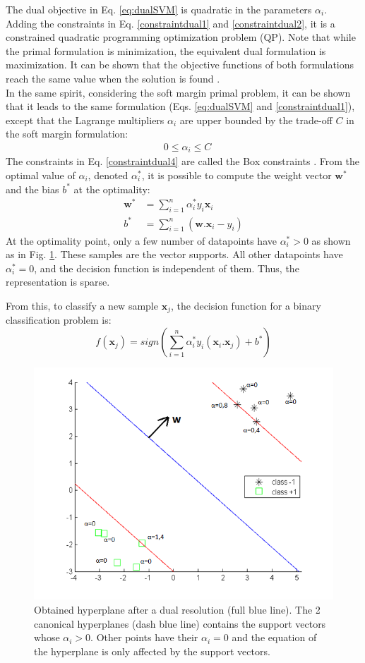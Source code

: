 \noindent The dual objective in Eq. \ref{eq:dualSVM} is quadratic in the parameters $\alpha_i$. Adding the constraints in Eq. \ref{constraintdual1} and \ref{constraintdual2}, it is a constrained quadratic programming optimization problem (QP). Note that while the primal formulation is minimization, the equivalent dual formulation is maximization. It can be shown that the objective functions of both formulations reach the same value when the solution is found \cite{Campbell2011}. \\
In the same spirit, considering the soft margin primal problem, it can be shown that it leads to the same formulation \cite{Campbell2011} (Eqs. \ref{eq:dualSVM} and \ref{constraintdual1}), except that 
the Lagrange multipliers $\alpha_i$ are upper bounded by the trade-off $C$ in the soft margin formulation:
\begin{align}
	& 0 \leq \alpha_i \leq C  \label{constraintdual4}
\end{align}
The constraints in Eq. \ref{constraintdual4} are called the Box constraints \cite{Campbell2011}. From the optimal value of $\alpha_i$, denoted $\alpha_i^*$, it is possible to compute the weight vector $\textbf{w}^*$ and the bias $b^*$ at the optimality:
\begin{align}
	\textbf{w}^* & = \sum\limits_{i=1}^{n}\alpha_i^* y_i \textbf{x}_i \\
	b^* & = \sum\limits_{i=1}^{n} (\textbf{w}.\textbf{x}_i - y_i)
\end{align}
At the optimality point, only a few number of datapoints have $\alpha_i^* > 0$ as shown as in Fig. \ref{fig:SVM_SV}. These samples are the vector supports. All other datapoints have $\alpha_i^*=0$, and the decision function is independent of them. Thus, the representation is sparse. 

\noindent From this, to classify a new sample $\textbf{x}_j$, the decision function for a binary classification problem is:
\begin{equation}
	f(\textbf{x}_j) = sign(\sum\limits_{i=1}^{n} \alpha_i^*y_i(\textbf{x}_i.\textbf{x}_j) + b^*) \label{decisionDual}
\end{equation} 

\begin{figure}[h!]
	\centering
	\includegraphics[width=0.6\linewidth]{images/SVM_SV2}
	\caption{Obtained hyperplane after a dual resolution (full blue line). The 2 canonical hyperplanes (dash blue line) contains the support vectors whose $\alpha_i > 0$. Other points have their $\alpha_i = 0$ and the equation of the hyperplane is only affected by the support vectors.}
	\label{fig:SVM_SV}
\end{figure}


